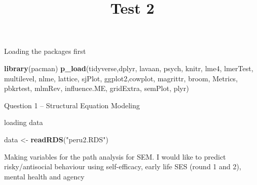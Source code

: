 \documentclass[9pt,]{article}
\title{Test 2}
\author{}
\date{}
\newenvironment{Shaded}{\begin{snugshade}}{\end{snugshade}}
\newcommand{\KeywordTok}[1]{\textcolor[rgb]{0.13,0.29,0.53}{\textbf{#1}}}
\newcommand{\StringTok}[1]{\textcolor[rgb]{0.31,0.60,0.02}{#1}}
\newcommand{\NormalTok}[1]{#1}
\begin{document}
\maketitle

Loading the packages first

\begin{Shaded}
\begin{Highlighting}[]
\KeywordTok{library}\NormalTok{(pacman)}
    \KeywordTok{p_load}\NormalTok{(tidyverse,dplyr, lavaan, psych, knitr, lme4, lmerTest, multilevel, nlme, lattice, sjPlot, ggplot2,cowplot, magrittr, broom, Metrics, pbkrtest, mlmRev, influence.ME, gridExtra, semPlot, plyr)}
\end{Highlighting}
\end{Shaded}

Question 1 -- Structural Equation Modeling

loading data

\begin{Shaded}
\begin{Highlighting}[]
\NormalTok{data <-}\StringTok{ }\KeywordTok{readRDS}\NormalTok{(}\StringTok{"peru2.RDS"}\NormalTok{)  }
\end{Highlighting}
\end{Shaded}

Making variables for the path analysis for SEM. I would like to predict
risky/antisocial behaviour using self-efficacy, early life SES (round 1
and 2), mental health and agency
\end{document}
